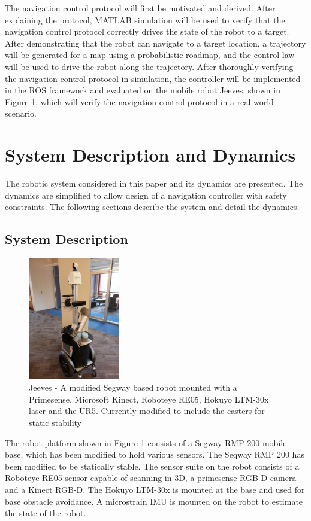 \documentclass[journal]{IEEEconf}
\begin{document}
The navigation control protocol will first be motivated and derived. After explaining the protocol, MATLAB simulation will be used to verify that the navigation control protocol correctly drives the state of the robot to a target. After demonstrating that the robot can navigate to a target location, a trajectory will be generated for a map using a probabilistic roadmap, and the control law will be used to drive the robot along the trajectory. After thoroughly verifying the navigation control protocol in simulation, the controller will be implemented in the ROS framework and evaluated on the mobile robot Jeeves, shown in Figure \ref{fig:jeeves}, which will verify the navigation control protocol in a real world scenario.

\section{System Description and Dynamics}
The robotic system considered in this paper and its dynamics are presented. The dynamics are simplified to allow design of a navigation controller with safety constraints. The following sections describe the system and detail the dynamics.
   
\subsection{System Description}
\begin{figure}
    \centering
    \includegraphics[width = 4cm, scale=0.2]{jeeves2_0.jpg}
    \caption{Jeeves - A modified Segway based robot mounted with a Primesense, Microsoft Kinect, Roboteye RE05, Hokuyo LTM-30x laser and the UR5. Currently modified to include the casters for static stability}
    \label{fig:jeeves}
\end{figure}

The robot platform shown in Figure \ref{fig:jeeves} consists of a Segway RMP-200 mobile base, which has been
modified to hold various sensors. The Seqway RMP 200 has been modified to be statically stable. The sensor suite on the robot consists of a Roboteye RE05 sensor capable of scanning in 3D, a primesense RGB-D camera and a Kinect RGB-D. The Hokuyo LTM-30x is mounted at the base and used for base obstacle avoidance. A microstrain IMU is mounted on the robot to estimate the state of the robot.
\end{document}
